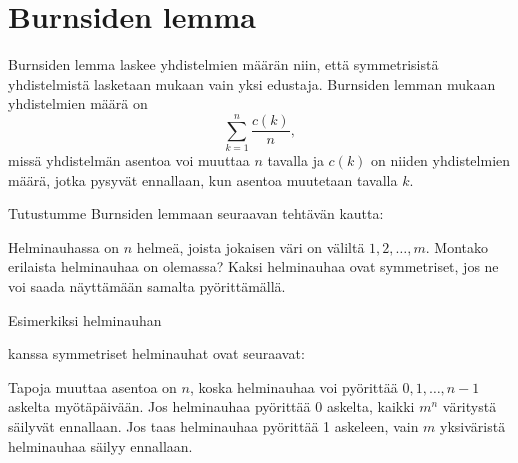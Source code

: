 \section{Burnsiden lemma}

Burnsiden lemma laskee yhdistelmien määrän niin,
että symmetrisistä yhdistelmistä lasketaan
mukaan vain yksi edustaja.
Burnsiden lemman mukaan yhdistelmien määrä on
\[\sum_{k=1}^n \frac{c(k)}{n},\]
missä yhdistelmän asentoa voi muuttaa $n$ tavalla
ja $c(k)$ on niiden yhdistelmien määrä,
jotka pysyvät ennallaan, kun asentoa
muutetaan tavalla $k$.

\newpage
\noindent
Tutustumme Burnsiden lemmaan seuraavan tehtävän kautta:

\begin{task}
Helminauhassa on $n$ helmeä,
joista jokaisen väri on väliltä $1,2,\ldots,m$.
Montako erilaista helminauhaa on olemassa?
Kaksi helminauhaa ovat symmetriset,
jos ne voi saada näyttämään samalta pyörittämällä.
\end{task}

\noindent
Esimerkiksi helminauhan
\begin{center}
\end{center}
kanssa symmetriset helminauhat ovat seuraavat:
\begin{center}
\end{center}
Tapoja muuttaa asentoa on $n$,
koska helminauhaa voi pyörittää $0,1,\ldots,n-1$
askelta myötäpäivään.
Jos helminauhaa pyörittää 0 askelta,
kaikki $m^n$ väritystä säilyvät ennallaan.
Jos taas helminauhaa pyörittää 1 askeleen,
vain $m$ yksiväristä helminauhaa säilyy ennallaan.

